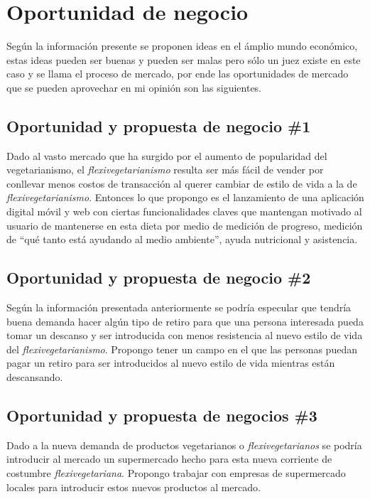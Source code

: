 \documentclass{article}
\begin{document}
\section{Oportunidad de negocio}
Según la información presente se proponen ideas en el ámplio mundo económico, estas ideas pueden ser buenas y pueden ser malas pero sólo un juez existe en este caso y se llama el proceso de mercado, por ende las oportunidades de mercado que se pueden aprovechar en mi opinión son las siguientes.

\subsection{Oportunidad y propuesta de negocio \#1}
Dado al vasto mercado que ha surgido por el aumento de popularidad del vegetarianismo, el \emph{flexivegetarianismo} resulta ser más fácil de vender por conllevar menos costos de transacción al querer cambiar de estilo de vida a la de \emph{flexivegetarianismo}. Entonces lo que propongo es el lanzamiento de una aplicación digital móvil y web con ciertas funcionalidades claves que mantengan motivado al usuario de mantenerse en esta dieta por medio de medición de progreso, medición de ``qué tanto está ayudando al medio ambiente'', ayuda nutricional y asistencia.

\subsection{Oportunidad y propuesta de negocio \#2}
Según la información presentada anteriormente se podría especular que tendría buena demanda hacer algún tipo de retiro para que una persona interesada pueda tomar un descanso y ser introducida con menos resistencia al nuevo estilo de vida del \emph{flexivegetarianismo}. Propongo tener un campo en el que las personas puedan pagar un retiro para ser introducidos al nuevo estilo de vida mientras están descansando.

\subsection{Oportunidad y propuesta de negocios \#3}
Dado a la nueva demanda de productos vegetarianos o \emph{flexivegetarianos} se podría introducir al mercado un supermercado hecho para esta nueva corriente de costumbre \emph{flexivegetariana}. Propongo trabajar con empresas de supermercado locales para introducir estos nuevos productos al mercado.
\end{document}
